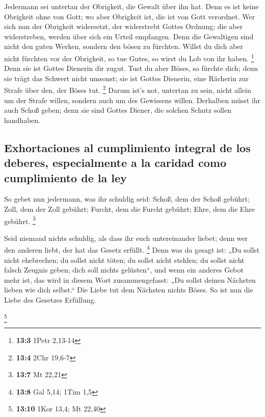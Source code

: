  Jedermann sei untertan der Obrigkeit, die Gewalt über ihn
hat. Denn es ist keine Obrigkeit ohne von Gott; wo aber Obrigkeit ist,
die ist von Gott verordnet.  Wer sich nun der Obrigkeit
widersetzt, der widerstrebt Gottes Ordnung; die aber widerstreben,
werden über sich ein Urteil empfangen.  Denn die
Gewaltigen sind nicht den guten Werken, sondern den bösen zu fürchten.
Willst du dich aber nicht fürchten vor der Obrigkeit, so tue Gutes, so
wirst du Lob von ihr haben. \footnote{\textbf{13:3} 1Petr 2,13-14}
 Denn sie ist Gottes Dienerin dir zugut. Tust du aber
Böses, so fürchte dich; denn sie trägt das Schwert nicht umsonst; sie
ist Gottes Dienerin, eine Rächerin zur Strafe über den, der Böses tut.
\footnote{\textbf{13:4} 2Chr 19,6-7}  Darum ist's not,
untertan zu sein, nicht allein um der Strafe willen, sondern auch um des
Gewissens willen.  Derhalben müsst ihr auch Schoß geben;
denn sie sind Gottes Diener, die solchen Schutz sollen handhaben.

\hypertarget{exhortaciones-al-cumplimiento-integral-de-los-deberes-especialmente-a-la-caridad-como-cumplimiento-de-la-ley}{%
\subsection{Exhortaciones al cumplimiento integral de los deberes,
especialmente a la caridad como cumplimiento de la
ley}\label{exhortaciones-al-cumplimiento-integral-de-los-deberes-especialmente-a-la-caridad-como-cumplimiento-de-la-ley}}

 So gebet nun jedermann, was ihr schuldig seid: Schoß, dem
der Schoß gebührt; Zoll, dem der Zoll gebührt; Furcht, dem die Furcht
gebührt; Ehre, dem die Ehre gebührt. \footnote{\textbf{13:7} Mt 22,21}

 Seid niemand nichts schuldig, als dass ihr euch
untereinander liebet; denn wer den anderen liebt, der hat das Gesetz
erfüllt. \footnote{\textbf{13:8} Gal 5,14; 1Tim 1,5}  Denn
was da gesagt ist: „Du sollst nicht ehebrechen; du sollst nicht töten;
du sollst nicht stehlen; du sollst nicht falsch Zeugnis geben; dich soll
nichts gelüsten``, und wenn ein anderes Gebot mehr ist, das wird in
diesem Wort zusammengefasst: „Du sollst deinen Nächsten lieben wie dich
selbst.``  Die Liebe tut dem Nächsten nichts Böses. So
ist nun die Liebe des Gesetzes Erfüllung.

\footnote{\textbf{13:10} 1Kor 13,4; Mt 22,40}

